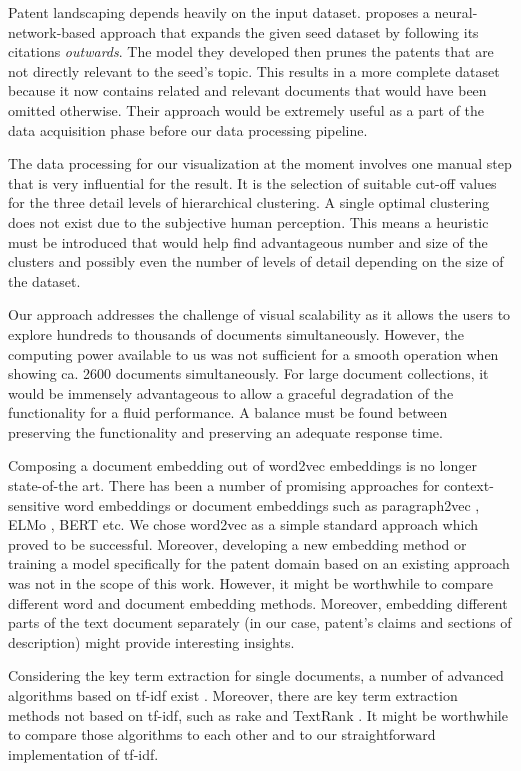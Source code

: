 Patent landscaping depends heavily on the input dataset.
\cite{Abood2018a} proposes a neural-network-based approach that expands the given seed dataset by following its citations \textit{outwards}.
The model they developed then prunes the patents that are not directly relevant to the seed's topic.
This results in a more complete dataset because it now contains related and relevant documents that would have been omitted otherwise.
Their approach would be extremely useful as a part of the data acquisition phase before our data processing pipeline.

The data processing for our visualization at the moment involves one manual step that is very influential for the result.
It is the selection of suitable cut-off values for the three detail levels of hierarchical clustering.
A single optimal clustering does not exist due to the subjective human perception.
This means a heuristic must be introduced that would help find advantageous number and size of the clusters and possibly even the number of levels of detail depending on the size of the dataset.

Our approach addresses the challenge of visual scalability as it allows the users to explore hundreds to thousands of documents simultaneously.
However, the computing power available to us was not sufficient for a smooth operation when showing ca. 2600 documents simultaneously.
For large document collections, it would be immensely advantageous to allow a graceful degradation of the functionality for a fluid performance.
A balance must be found between preserving the functionality and preserving an adequate response time.

Composing a document embedding out of word2vec embeddings is no longer state-of-the art.
There has been a number of promising approaches for context-sensitive word embeddings or document embeddings such as paragraph2vec \cite{Le2014}, ELMo \cite{Peters2018}, BERT \cite{Devlin2018} etc.
We chose word2vec as a simple standard approach which proved to be successful.
Moreover, developing a new embedding method or training a model specifically for the patent domain based on an existing approach was not in the scope of this work.
However, it might be worthwhile to compare different word and document embedding methods.
Moreover, embedding different parts of the text document separately (in our case, patent's claims and sections of description) might provide interesting insights.

Considering the key term extraction for single documents, a number of advanced algorithms based on \gls{tf-idf} exist \cite{Liu2010} \cite{Kim2009}.
Moreover, there are key term extraction methods not based on \gls{tf-idf}, such as \gls{rake} \cite{rose} and TextRank \cite{Mihalcea2004}.
It might be worthwhile to compare those algorithms to each other and to our straightforward implementation of \gls{tf-idf}.

